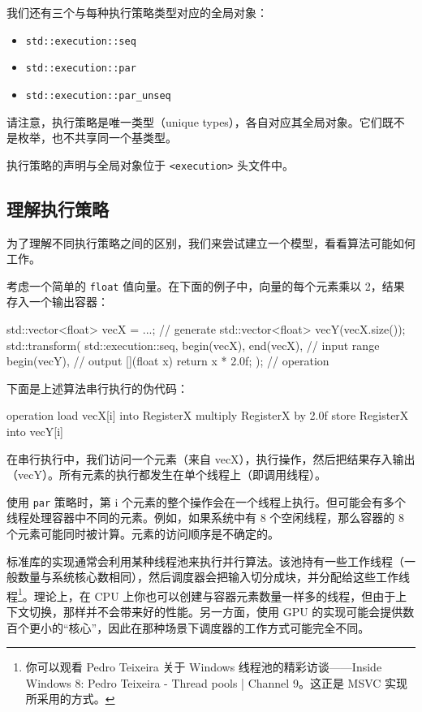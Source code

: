 我们还有三个与每种执行策略类型对应的全局对象：
\begin{itemize}
\item \texttt{std::execution::seq}
\item \texttt{std::execution::par}
\item \texttt{std::execution::par\_unseq}
\end{itemize}

请注意，执行策略是唯一类型（unique types），各自对应其全局对象。它们既不是枚举，也不共享同一个基类型。

执行策略的声明与全局对象位于 \texttt{<execution>} 头文件中。


\subsection{理解执行策略}

为了理解不同执行策略之间的区别，我们来尝试建立一个模型，看看算法可能如何工作。

考虑一个简单的 \texttt{float} 值向量。在下面的例子中，向量的每个元素乘以 2，结果存入一个输出容器：

\begin{codebox}[cpp]
std::vector<float> vecX = {...};
// generate
std::vector<float> vecY(vecX.size());
std::transform(
std::execution::seq,
begin(vecX), end(vecX),
// input range
begin(vecY),
// output
[](float x) { return x * 2.0f; }); // operation
\end{codebox}

下面是上述算法串行执行的伪代码：

\begin{codebox}[text]
operation
{
load vecX[i] into RegisterX
multiply RegisterX by 2.0f
store RegisterX into vecY[i]
}
\end{codebox}

在串行执行中，我们访问一个元素（来自 vecX），执行操作，然后把结果存入输出（vecY）。所有元素的执行都发生在单个线程上（即调用线程）。

使用 \texttt{par} 策略时，第 i 个元素的整个操作会在一个线程上执行。但可能会有多个线程处理容器中不同的元素。例如，如果系统中有 8 个空闲线程，那么容器的 8 个元素可能同时被计算。元素的访问顺序是不确定的。

标准库的实现通常会利用某种线程池来执行并行算法。该池持有一些工作线程（一般数量与系统核心数相同），然后调度器会把输入切分成块，并分配给这些工作线程\footnote{你可以观看 Pedro Teixeira 关于 Windows 线程池的精彩访谈——Inside Windows 8: Pedro Teixeira - Thread pools | Channel 9。这正是 MSVC 实现所采用的方式。}。理论上，在 CPU 上你也可以创建与容器元素数量一样多的线程，但由于上下文切换，那样并不会带来好的性能。另一方面，使用 GPU 的实现可能会提供数百个更小的“核心”，因此在那种场景下调度器的工作方式可能完全不同。

